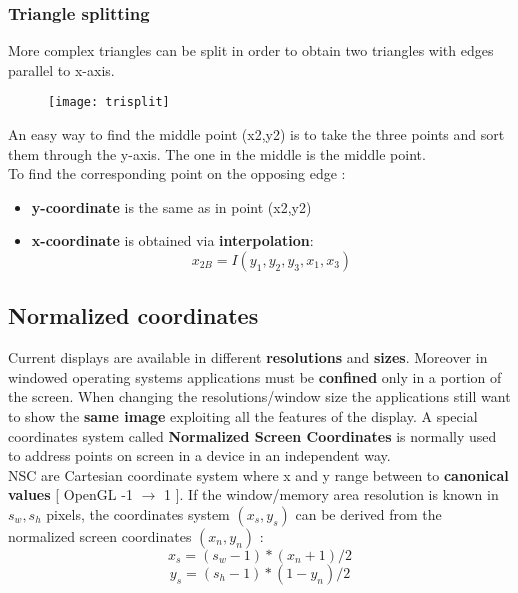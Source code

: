 \subsubsection{Triangle splitting}
More complex triangles can be split in order to obtain two triangles with edges parallel to x-axis.\\
\begin{figure}[H]
 \centering
  \texttt{[image: trisplit]}
\end{figure}
An easy way to find the middle point (x2,y2) is to take the three points and sort them through the y-axis. The one in the middle is the middle point.\\
To find the corresponding point on the opposing edge : 
\begin{itemize}
\item \textbf{y-coordinate} is the same as in point (x2,y2)
\item \textbf{x-coordinate} is obtained via \textbf{interpolation}: $$ x_{2B} = I(y_1,y_2,y_3,x_1,x_3)$$
\end{itemize}

\subsection{Normalized coordinates}
Current displays are available in different \textbf{resolutions} and \textbf{sizes}.
Moreover in windowed operating systems applications must be \textbf{confined} only in a portion of the screen.
When changing the resolutions/window size the applications still want to show the \textbf{same image} exploiting all the features of the display.
A special coordinates system called \textbf{Normalized Screen Coordinates} is normally used to address points on screen in a device in an independent way.\\
NSC are Cartesian coordinate system where x and y range between to \textbf{canonical values} [ OpenGL -1 $\to$ 1 ].  If the window/memory area resolution is known in $s_w,s_h$ pixels, the coordinates system $(x_s,y_s)$ can be derived from the normalized screen coordinates $ (x_n , y_n) $ : 
$$ x_s = (s_w-1)*(x_n+1)/2 $$ $$ y_s = (s_h-1)*(1-y_n)/2 $$ 
